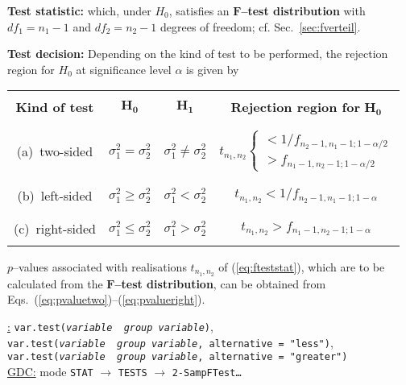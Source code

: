 \medskip
\noindent
\textbf{Test statistic:}
%
\be
{}
\ee
%
which, under $H_{0}$, satisfies an $\boldsymbol{F}$\textbf{--test
distribution} with $df_{1}=n_{1}-1$ and $df_{2}=n_{2}-1$ degrees of
freedom; cf. Sec.~\ref{sec:fverteil}.

\medskip
\noindent
\textbf{Test decision:} Depending on the kind of test to be 
performed, the rejection region for $H_{0}$ at significance level 
$\alpha$ is given by
%
\begin{center}
\begin{tabular}[h]{c|c|c|c}
 & & & \\
\textbf{Kind of test} & $\boldsymbol{H_{0}}$ &
$\boldsymbol{H_{1}}$ &
\textbf{Rejection region for} $\boldsymbol{H_{0}}$ \\
 & & & \\
\hline
 & & & \\
(a)~two-sided & $\sigma_{1}^{2}=\sigma_{2}^{2}$ & $\sigma_{1}^{2} 
\neq \sigma_{2}^{2}$ &
$t_{n_{1},n_{2}}\begin{cases} < 1/f_{n_{2}-1,n_{1}-1;1-\alpha/2} \\
> f_{n_{1}-1,n_{2}-1;1-\alpha/2} \end{cases}$ \\
 & & & \\
\hline
 & & & \\
(b)~left-sided & $\sigma_{1}^{2} \geq \sigma_{2}^{2}$ & 
$\sigma_{1}^{2} < \sigma_{2}^{2}$ &
$t_{n_{1},n_{2}} < 1/f_{n_{2}-1,n_{1}-1;1-\alpha}$ \\
 & & & \\
\hline
 & & & \\
(c)~right-sided & $\sigma_{1}^{2} \leq \sigma_{2}^{2}$ & 
$\sigma_{1}^{2} > \sigma_{2}^{2}$ &
$t_{n_{1},n_{2}} > f_{n_{1}-1,n_{2}-1;1-\alpha}$ \\
 & & &
\end{tabular}
\end{center}
%
$p$--values associated with realisations $t_{n_{1},n_{2}}$ of 
(\ref{eq:fteststat}), which are to be calculated from the
$\boldsymbol{F}$\textbf{--test distribution}, can be obtained from 
Eqs.~(\ref{eq:pvaluetwo})--(\ref{eq:pvalueright}).

\medskip
\noindent
\underline{\R:}
\texttt{var.test(\textit{variable}~\texttildelow~\textit{group
variable})}, \\
\texttt{var.test(\textit{variable}~\texttildelow~\textit{group
variable}, alternative = "less")}, \\
\texttt{var.test(\textit{variable}~\texttildelow~\textit{group
variable}, alternative = "greater")} \\
\underline{GDC:} mode \texttt{STAT} $\rightarrow$ \texttt{TESTS}
$\rightarrow$ \texttt{2-SampFTest\ldots}

